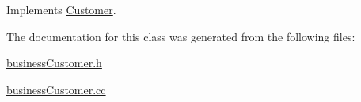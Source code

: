 Implements \hyperlink{classCustomer_a4ef104426d09a4817cb2d55e5e674d0}{Customer}.

The documentation for this class was generated from the following files:\begin{CompactItemize}
\item 
\hyperlink{businessCustomer_8h}{businessCustomer.h}\item 
\hyperlink{businessCustomer_8cc}{businessCustomer.cc}\end{CompactItemize}
